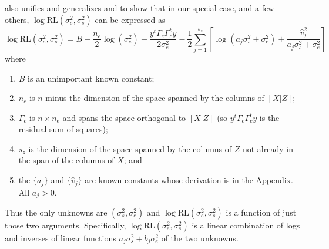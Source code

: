 \documentclass{report}
\newcommand{\RLorig}{\text{RL}}
\newcommand{\logRLorig}{\log\RLorig}
\newcommand{\sigssq}{\sigma_s^2}
\newcommand{\sigesq}{\sigma_e^2}
\newcommand{\logRLssorig}{\logRLorig(\sigesq,\sigssq)}
\newcommand{\ass}{a_j\sigssq + \sigesq}
\newcommand{\abss}{a_j\sigssq + b_j\sigesq}
\begin{document}
\cite{hodges:2013} also unifies and generalizes \cite{reich_hodges:2008} and \cite{welham_thompson:2009} to show that in our special case, and a few others, $\logRLssorig$ can be expressed as
\begin{equation}
\label{eq:reexpress}
  \logRLssorig = B - \frac{n_e}{2}\log(\sigesq) - \frac{y^t \Gamma_c \Gamma^t_c y}{2\sigesq} 
    - \frac{1}{2} \sum_{j=1}^{s_z} \left[ \log(\ass) + \frac{\hat v_j^2}{\ass}\right]
\end{equation}
where
\begin{enumerate}[label=(\arabic*)]
  \item $B$ is an unimportant known constant;
  \item $n_e$ is $n$ minus the dimension of the space spanned by the columns of $[X|Z]$;
  \item $\Gamma_c$ is $n \times n_e$ and spans the space orthogonal to $[X|Z]$
    (so $y^t \Gamma_c \Gamma^t_c y$ is the residual sum of squares);
  \item $s_z$ is the dimension of the space spanned by the columns of $Z$ not already
    in the span of the columns of $X$; and
  \item the $\{a_j\}$ and $\{\hat v_j\}$ are known constants whose derivation is in the Appendix.  All $a_j>0$.
\end{enumerate}
Thus the only unknowns are $(\sigma^2_s, \sigma^2_e)$ and $\logRLssorig$ is a function of just those two arguments.  Specifically, $\logRLssorig$ is a linear combination of logs and inverses of linear functions $\abss$ of the two unknowns.
\end{document}
